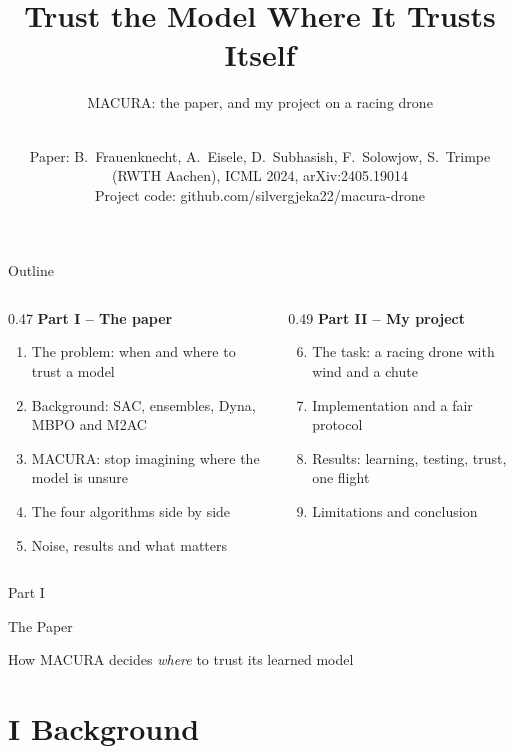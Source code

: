 \documentclass[aspectratio=169,10pt]{beamer}
\title{Trust the Model Where It Trusts Itself}
\subtitle{MACURA: the paper, and my project on a racing drone}
\author{\presenter}
\institute{\small Department of Computer Science\\ Master's Degree in Artificial Intelligence\\ University of Verona}
\date{\small \course\talkdate\\[0.8em]\scriptsize Paper: B.~Frauenknecht, A.~Eisele, D.~Subhasish, F.~Solowjow, S.~Trimpe
      (RWTH Aachen), ICML 2024, arXiv:2405.19014\\ Project code: github.com/silvergjeka22/macura-drone}
\newcommand{\partslide}[3]{%
  \begin{frame}[plain]
    \vfill\centering
    {\large Part #1}\par\vspace{1.0em}
    {\usebeamerfont{title}\color{navy}#2\par}\vspace{1.0em}
    {\normalsize #3\par}
    \vfill
  \end{frame}}
\begin{document}
\begin{frame}[plain]
  \titlepage
\end{frame}

\begin{frame}{Outline}
  \begin{columns}[T]
    \begin{column}{0.47\textwidth}
      {\large\bfseries\color{navy} Part I -- The paper}
      \begin{enumerate}
        \item The problem: when and where to trust a model
        \item Background: SAC, ensembles, Dyna, MBPO and M2AC
        \item MACURA: stop imagining where the model is unsure
        \item The four algorithms side by side
        \item Noise, results and what matters
      \end{enumerate}
    \end{column}
    \begin{column}{0.49\textwidth}
      {\large\bfseries\color{navy} Part II -- My project}
      \begin{enumerate}\setcounter{enumi}{5}
        \item The task: a racing drone with wind and a chute
        \item Implementation and a fair protocol
        \item Results: learning, testing, trust, one flight
        \item Limitations and conclusion
      \end{enumerate}
    \end{column}
  \end{columns}
\end{frame}

\partslide{I}{The Paper}{How MACURA decides \emph{where} to trust its learned model}
\section{I \textperiodcentered{} Background}
\end{document}

